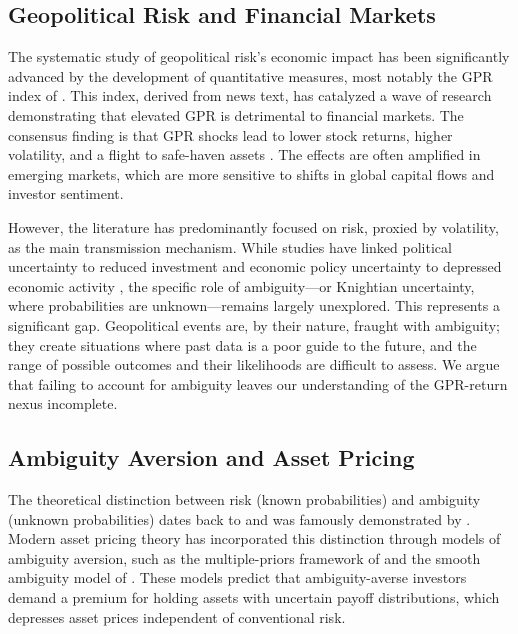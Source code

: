 \documentclass[preprint,12pt,authoryear]{elsarticle}
\begin{document}
\subsection{Geopolitical Risk and Financial Markets}

The systematic study of geopolitical risk's economic impact has been significantly advanced by the development of quantitative measures, most notably the GPR index of \citet{Caldara2022}. This index, derived from news text, has catalyzed a wave of research demonstrating that elevated GPR is detrimental to financial markets. The consensus finding is that GPR shocks lead to lower stock returns, higher volatility, and a flight to safe-haven assets \citep{Caldara2022}. The effects are often amplified in emerging markets, which are more sensitive to shifts in global capital flows and investor sentiment.

However, the literature has predominantly focused on risk, proxied by volatility, as the main transmission mechanism. While studies have linked political uncertainty to reduced investment \citep{Pastor2013} and economic policy uncertainty to depressed economic activity \citep{Baker2016}, the specific role of ambiguity—or Knightian uncertainty, where probabilities are unknown—remains largely unexplored. This represents a significant gap. Geopolitical events are, by their nature, fraught with ambiguity; they create situations where past data is a poor guide to the future, and the range of possible outcomes and their likelihoods are difficult to assess. We argue that failing to account for ambiguity leaves our understanding of the GPR-return nexus incomplete.

\subsection{Ambiguity Aversion and Asset Pricing}

The theoretical distinction between risk (known probabilities) and ambiguity (unknown probabilities) dates back to \citet{Knight1921} and was famously demonstrated by \citet{Ellsberg1961}. Modern asset pricing theory has incorporated this distinction through models of ambiguity aversion, such as the multiple-priors framework of \citet{Gilboa1989} and the smooth ambiguity model of \citet{Klibanoff2005}. These models predict that ambiguity-averse investors demand a premium for holding assets with uncertain payoff distributions, which depresses asset prices independent of conventional risk.
\end{document}
